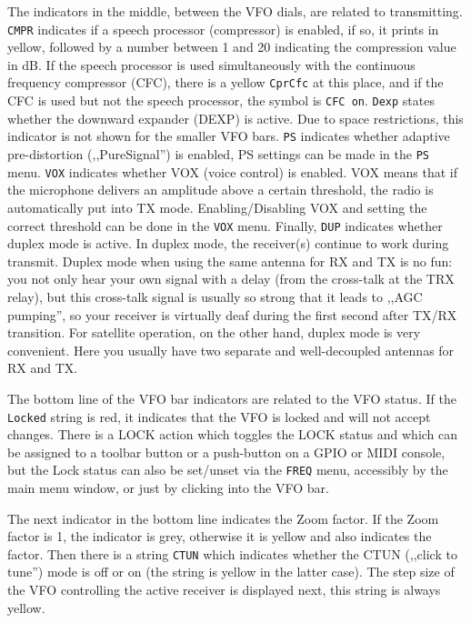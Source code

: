 \documentclass[12pt]{book}
\def\rett#1{\texttt{\color{red}#1}}
\def\bltt#1{\texttt{\color{blue}#1}}
\begin{document}
The indicators in the middle, between the VFO dials, are related to
transmitting. \rett{CMPR} indicates if a speech processor
(compressor) is enabled, if so, it prints in yellow, followed
by a number between 1 and 20 indicating the compression value in dB.
If the speech processor is used simultaneously with the continuous frequency
compressor (CFC), there is a yellow \rett{CprCfc} at this place, and if
the CFC is used but not the speech processor, the symbol is \rett{CFC on}.
\rett{Dexp} states whether the downward expander (DEXP) is active. Due to space
restrictions, this indicator is not shown for the smaller VFO bars.
\rett{PS} indicates whether adaptive pre-distortion (,,PureSignal'')
is enabled, PS settings can be made in the \bltt{PS} menu.
 \rett{VOX} indicates whether VOX (voice control) is enabled. VOX means
 that if  the microphone delivers an amplitude above a certain threshold,
 the radio is automatically put into TX mode. Enabling/Disabling VOX
 and setting the correct threshold can be done in the \bltt{VOX} menu.
 Finally, \rett{DUP} indicates whether duplex mode is active.
 In duplex mode, the receiver(s) continue to work during transmit. Duplex
 mode when using the same antenna for RX and TX is  no fun: you not only hear
 your own signal with a delay (from the cross-talk at the TRX relay), but
 this cross-talk signal is  usually so strong that it leads to ,,AGC pumping'', so
 your receiver is virtually deaf during the first second after TX/RX
 transition. For satellite operation, on the other hand, duplex  mode
 is very convenient. Here you usually have two separate and well-decoupled
 antennas for RX and TX.

 The bottom line of the VFO bar  indicators are related to the VFO status.
 If the \rett{Locked} string is red, it indicates that the VFO is locked
 and will not accept changes. There is a LOCK action which toggles the
 LOCK status and which can be assigned to a toolbar button or a push-button
 on a GPIO or MIDI console, but the Lock status can also be set/unset
 via the \bltt{FREQ} menu, accessibly by the main menu window, or just by
 clicking into the VFO bar.

The next indicator in the bottom  line indicates the Zoom factor. If the
Zoom factor is 1, the indicator is grey, otherwise it is yellow and
also indicates the factor. Then there is a string \rett{CTUN} which
indicates whether the CTUN (,,click to tune'') mode is off or on (the string
is yellow in the latter case). The step size of the VFO controlling the
active receiver is displayed next, this string is always yellow.
\end{document}
